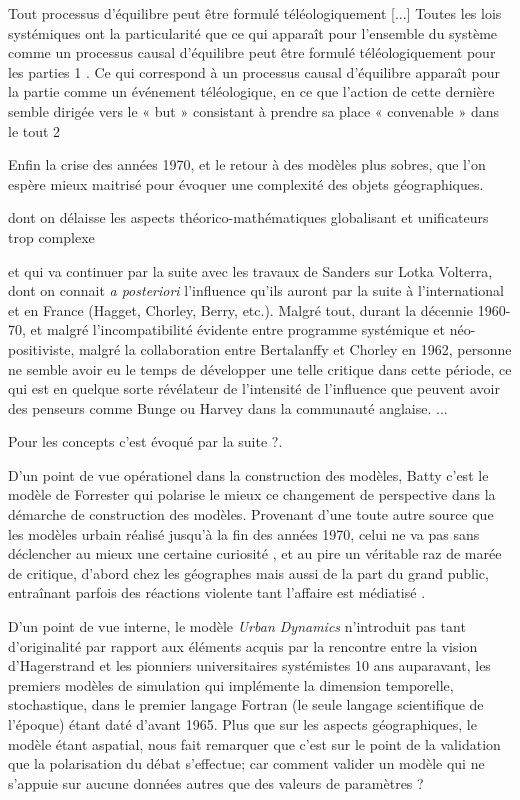 {\autocite[114]{Pouvreau2013}
Tout processus d’équilibre peut être formulé téléologiquement [...] Toutes les lois systémiques ont
la particularité que ce qui apparaît pour l’ensemble du système comme un processus causal
d’équilibre peut être formulé téléologiquement pour les parties 1 .
Ce qui correspond à un processus causal d’équilibre apparaît pour la partie comme un événement
téléologique, en ce que l’action de cette dernière semble dirigée vers le « but » consistant à prendre
sa place « convenable » dans le tout 2

Enfin la crise des années 1970, et le retour à des modèles plus sobres, que l'on espère mieux maitrisé pour évoquer une complexité des objets géographiques.

dont on délaisse les aspects théorico-mathématiques globalisant et unificateurs trop complexe

et qui va continuer par la suite avec les travaux de Sanders sur Lotka Volterra,   dont on connait \textit{a posteriori} l'influence qu'ils auront par la suite à l'international et en France (Hagget, Chorley, Berry, etc.). Malgré tout, durant la décennie 1960-70, et malgré l'incompatibilité  évidente entre programme systémique et néo-positiviste, malgré la collaboration entre Bertalanffy et Chorley en 1962, personne ne semble avoir eu le temps de développer une telle critique dans cette période, ce qui est en quelque sorte révélateur de l'intensité de l'influence que peuvent avoir des penseurs comme Bunge ou Harvey dans la communauté anglaise. \autocite[123]{Unwin1992}...

Pour les concepts c'est évoqué par la suite ?. 






D'un point de vue opérationel dans la construction des modèles, Batty \autocite{Batty2001} \autocite[13]{Batty2008} c'est le modèle de Forrester \autocite{Forrester1969} qui polarise le mieux ce changement de perspective dans la démarche de construction des modèles. Provenant d'une toute autre source que les modèles urbain réalisé jusqu'à la fin des années 1970, celui ne va pas sans déclencher au mieux une certaine curiosité \autocite{Lee1973} , et au pire un véritable raz de marée de critique, d'abord chez les géographes\autocite{Tobler1970a} mais aussi de la part du grand public, entraînant parfois des réactions violente tant l'affaire est médiatisé \autocite[9]{Forrester1989}. 

D'un point de vue interne, le modèle \textit{Urban Dynamics} n'introduit pas tant d'originalité par rapport aux éléments acquis par la rencontre entre la vision d'Hagerstrand et les pionniers universitaires systémistes 10 ans auparavant, les premiers modèles de simulation qui implémente la dimension temporelle, stochastique, dans le premier langage Fortran (le seule langage scientifique de l'époque) étant daté d'avant 1965. Plus que sur les aspects géographiques, le modèle étant aspatial, \autocite{Batty2001} nous fait remarquer que c'est sur le point de la validation que la polarisation du débat s'effectue; car comment valider un modèle qui ne s'appuie sur aucune données autres que des valeurs de paramètres ?

}
